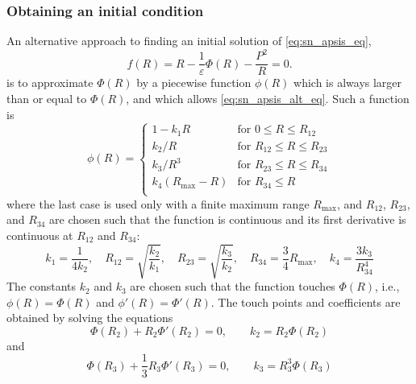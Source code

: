 \subsubsection{Obtaining an initial condition}
%
An alternative approach to finding an initial solution of \cref{eq:sn_apsis_eq},
%
\begin{equation}
    \label{eq:sn_apsis_alt_eq}
    f(R) = R - \frac{1}{\varepsilon} \Phi(R) - \frac{P^2}{R} = 0.
\end{equation}
%
is to approximate $\Phi(R)$ by a piecewise function $\phi(R)$ which is always larger than or equal to $\Phi(R)$, and which allows \cref{eq:sn_apsis_alt_eq}.
Such a function is
%
\begin{equation}
    \label{eq:sn_apsis_alt_approx}
    \phi(R) =
        \begin{cases}
            1 - k_1 R                 &  \text{for $0 \le R \le R_{12}$} \\
            k_2 / R                   &  \text{for $R_{12} \le R \le R_{23}$} \\
            k_3 / R^3                 &  \text{for $R_{23} \le R \le R_{34}$} \\
            k_4 (R_\mathrm{max} - R)  &  \text{for $R_{34} \le R$} \\
        \end{cases}
\end{equation}
%
where the last case is used only with a finite maximum range $R_\mathrm{max}$, and $R_{12}$, $R_{23}$, and $R_{34}$ are chosen such that the function is continuous and its first derivative is continuous at $R_{12}$ and $R_{34}$:
%
\begin{equation}
    \label{eq:sn_apsis_alt_join}
    k_1 = \frac{ 1 }{ 4 k_2 },
    \quad R_{12} = \sqrt{ \frac{ k_2 }{ k_1 }},
    \quad R_{23} = \sqrt{ \frac{ k_3 }{ k_2 }},
    \quad R_{34} = \frac{3}{4} R_\mathrm{max},
    \quad k_4 = \frac{ 3 k_3 }{ R_{34}^4 }
\end{equation}
%
The constants $k_2$ and $k_3$ are chosen such that the function touches $\Phi(R)$, i.e., $\phi(R) = \Phi(R)$ and $\phi'(R) = \Phi'(R)$.
The touch points and coefficients are obtained by solving the equations
%
\begin{equation}
    \Phi(R_2) + R_2 \Phi'(R_2) = 0, \qquad k_2 = R_2 \Phi(R_2)
\end{equation}
%
and
%
\begin{equation}
    \Phi(R_3) + \frac{1}{3} R_3 \Phi'(R_3) = 0, \qquad k_3 = R_3^3 \Phi(R_3)
\end{equation}

